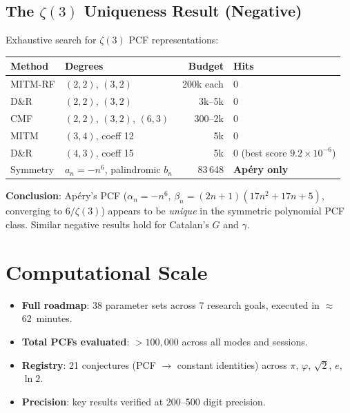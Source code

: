 \documentclass[11pt,a4paper]{article}
\begin{document}
\subsection{The $\zeta(3)$ Uniqueness Result (Negative)}

Exhaustive search for $\zeta(3)$ PCF representations:

\begin{center}
\begin{tabular}{llrl}
\toprule
Method & Degrees & Budget & Hits \\
\midrule
MITM-RF  & $(2,2)$, $(3,2)$ & 200k each & 0 \\
D\&R     & $(2,2)$, $(3,2)$ & 3k--5k & 0 \\
CMF      & $(2,2)$, $(3,2)$, $(6,3)$ & 300--2k & 0 \\
MITM     & $(3,4)$, coeff 12 & 5k & 0 \\
D\&R     & $(4,3)$, coeff 15 & 5k & 0 (best score $9.2 \times 10^{-6}$) \\
Symmetry & $a_n = -n^6$, palindromic $b_n$ & 83\,648 & \textbf{Ap\'ery only} \\
\bottomrule
\end{tabular}
\end{center}

\noindent\textbf{Conclusion}: Ap\'ery's PCF ($\alpha_n = -n^6$, $\beta_n = (2n{+}1)(17n^2 + 17n + 5)$, converging to $6/\zeta(3)$) appears to be \emph{unique} in the symmetric polynomial PCF class.  Similar negative results hold for Catalan's $G$ and $\gamma$.

\section{Computational Scale}

\begin{itemize}
\item \textbf{Full roadmap}: 38 parameter sets across 7 research goals, executed in $\approx$62~minutes.
\item \textbf{Total PCFs evaluated}: $> 100{,}000$ across all modes and sessions.
\item \textbf{Registry}: 21 conjectures (PCF $\to$ constant identities) across $\pi$, $\varphi$, $\sqrt{2}$, $e$, $\ln 2$.
\item \textbf{Precision}: key results verified at 200--500 digit precision.
\end{itemize}
\end{document}
